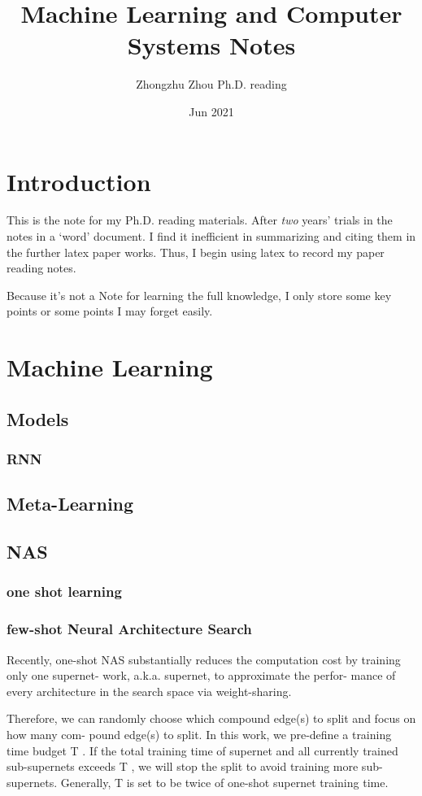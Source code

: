 \documentclass[UTF8]{article}
\title{Machine Learning and Computer Systems Notes}
\author{Zhongzhu Zhou Ph.D. reading}
\date{Jun 2021}
\begin{document}
\maketitle

\tableofcontents

\section{Introduction}
This is the note for my Ph.D. reading materials. After \emph{two} years' trials in the notes in a `word' document. I find it inefficient in summarizing and citing them in the further latex paper works. Thus, I begin using latex to record my paper reading notes.

Because it's not a Note for learning the full knowledge, I only store some key points or some points I may forget easily.

\section{Machine Learning}
\subsection{Models}
\subsubsection{RNN}

\subsection{Meta-Learning}
\subsection{NAS}
\subsubsection{one shot learning}

\subsubsection{few-shot Neural Architecture Search}
Recently, one-shot NAS substantially reduces the computation cost by training only one supernet- work, a.k.a. supernet, to approximate the perfor- mance of every architecture in the search space via weight-sharing.

Therefore, we can randomly choose which compound edge(s) to split and focus on how many com- pound edge(s) to split. In this work, we pre-define a training time budget T . If the total training time of supernet and all currently trained sub-supernets exceeds T , we will stop the split to avoid training more sub-supernets. Generally, T is set to be twice of one-shot supernet training time. 
\end{document}
